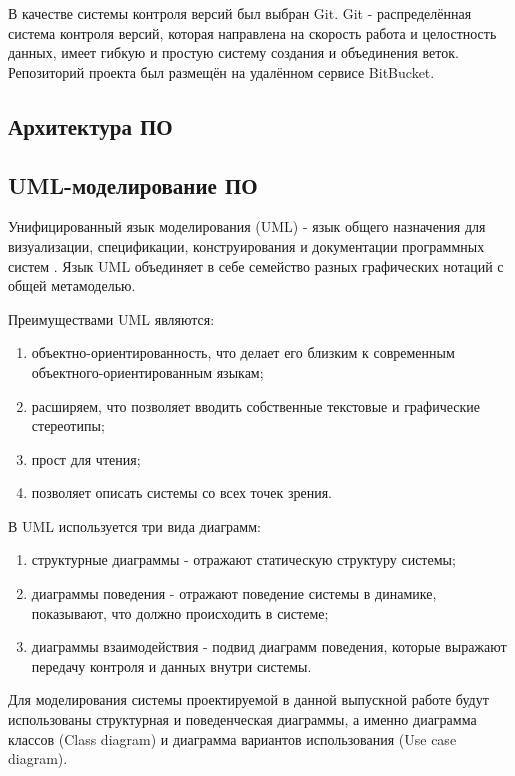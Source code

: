 В качестве системы контроля версий был выбран Git. Git - распределённая система контроля версий, которая направлена на скорость работа и целостность данных, имеет гибкую и простую систему создания и объединения веток. Репозиторий проекта был размещён на удалённом сервисе BitBucket.

\subsection{Архитектура ПО}

\subsection{UML-моделирование ПО}

Унифицированный язык моделирования (UML) - язык общего назначения для визуализации, спецификации, конструирования и документации программных систем \cite{UML_USER_GUIDE_2ND}. Язык UML объединяет в себе семейство разных графических нотаций с общей метамоделью. 

Преимуществами UML являются:

\begin{enumerate}
    \item объектно-ориентированность, что делает его близким к современным объектного-ориентированным языкам;
    \item расширяем, что позволяет вводить собственные текстовые и графические стереотипы;
    \item прост для чтения;
    \item позволяет описать системы со всех точек зрения.
\end{enumerate}

В UML используется три вида диаграмм:

\begin{enumerate}
    \item структурные диаграммы - отражают статическую структуру системы;
    \item диаграммы поведения - отражают поведение системы в динамике, показывают, что должно происходить в системе;
    \item диаграммы взаимодействия - подвид диаграмм поведения, которые выражают передачу контроля и данных внутри системы.
\end{enumerate} 

Для моделирования системы проектируемой в данной выпускной работе будут использованы структурная и поведенческая диаграммы, а именно диаграмма классов (Class diagram) и диаграмма вариантов использования (Use case diagram).

